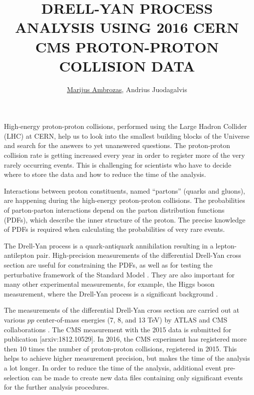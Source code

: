 \documentclass[a4paper,10pt,english]{article}
\begin{document}
\renewcommand{\figurename}{Fig.} 


\title{DRELL-YAN PROCESS ANALYSIS USING 2016 CERN CMS PROTON-PROTON COLLISION DATA}


\author{\uline{Marijus Ambrozas}, Andrius Juodagalvis}

\maketitle

\address{Institute of Theoretical Physics and Astronomy, Faculty of Physics, Vilnius University, Lithuania}


High-energy proton-proton collisions, performed using the Large Hadron Collider (LHC) at CERN, help us to
look into the smallest building blocks of the Universe and search for the answers to yet unanswered
questions.
The proton-proton collision rate is getting increased every year in order to register more of the very
rarely occurring events.
This is challenging for scientists who have to decide where to store the data and how to reduce the time of
the analysis.

Interactions between proton constituents, named ``partons'' (quarks and gluons), are happening during the
high-energy proton-proton collisions.
The probabilities of parton-parton interactions depend on the parton distribution functions (PDFs), which describe
the inner structure of the proton.
The precise knowledge of PDFs is required when calculating the probabilities of very rare events.

The Drell-Yan process is a quark-antiquark annihilation resulting in a lepton-antilepton pair.
High-precision measurements of the differential Drell-Yan cross section are useful for constraining the PDFs, as
well as for testing the perturbative framework of the Standard Model \cite{DY13}.
They are also important for many other experimental measurements, for example, the Higgs boson
measurement, where the Drell-Yan process is a significant background \cite{higgs}.

The measurements of the differential Drell-Yan cross section are carried out at various $p\!p$ center-of-mass energies
(7, 8, and 13 TeV) by ATLAS and CMS collaborations \cite{DY13, DY7CMS, DY7ATLAS, DY8CMS, DY8ATLAS}.
The CMS measurement with the 2015 data is submitted for publication [arxiv:1812.10529].
In 2016, the CMS experiment has registered more then 10 times the number of proton-proton collisions, registered in
2015.
This helps to achieve higher measurement precision, but makes the time of the analysis a lot longer.
In order to reduce the time of the analysis, additional event pre-selection can be made to create new data files containing
only significant events for the further analysis procedures.
\end{document}
